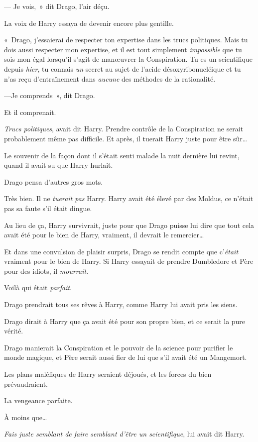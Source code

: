 --- Je vois,~» dit Drago, l'air déçu.

La voix de Harry essaya de devenir encore plus gentille.

«~Drago, j'essaierai de respecter ton expertise dans les trucs politiques. Mais tu dois aussi respecter mon expertise, et il est tout simplement \emph{impossible} que tu sois mon égal lorsqu'il s'agit de manœuvrer la Conspiration. Tu es un scientifique depuis \emph{hier}, tu connais \emph{un} secret au sujet de l'acide désoxyribonucléique et tu n'as reçu d'entraînement dans \emph{aucune} des méthodes de la rationalité.

---Je comprends~», dit Drago.

Et il comprenait.

\emph{Trucs politiques}, avait dit Harry. Prendre contrôle de la Conspiration ne serait probablement même pas difficile. Et après, il tuerait Harry juste pour être sûr…

Le souvenir de la façon dont il s'était senti malade la nuit dernière lui revint, quand il avait su que Harry hurlait.

Drago pensa d'autres gros mots.

Très bien. Il ne \emph{tuerait pas} Harry. Harry avait été élevé par des Moldus, ce n'était pas sa faute s'il était dingue.

Au lieu de ça, Harry survivrait, juste pour que Drago puisse lui dire que tout cela avait été pour le bien de Harry, vraiment, il devrait le remercier…

Et dans une convulsion de plaisir surpris, Drago se rendit compte que c'\emph{était} vraiment pour le bien de Harry. Si Harry essayait de prendre Dumbledore et Père pour des idiots, il \emph{mourrait}.

Voilà qui était \emph{parfait}.

Drago prendrait tous ses rêves à Harry, comme Harry lui avait pris les siens.

Drago dirait à Harry que ça avait été pour son propre bien, et ce serait la pure vérité.

Drago manierait la Conspiration et le pouvoir de la science pour purifier le monde magique, et Père serait aussi fier de lui que s'il avait été un Mangemort.

Les plans maléfiques de Harry seraient déjoués, et les forces du bien prévaudraient.

La vengeance parfaite.

À moins que…

\emph{Fais juste semblant de faire semblant d'être un scientifique}, lui avait dit Harry.

